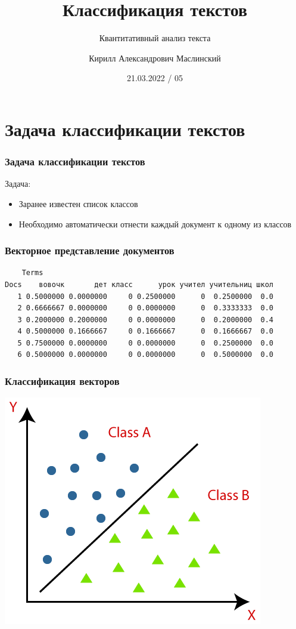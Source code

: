 \documentclass[svgnames]{beamer}
\title[CMTA 05] %
{Классификация текстов}
\subtitle
{Квантитативный анализ текста} %
\author%
{Кирилл Александрович Маслинский}
\institute%
{НИУ ВШЭ Санкт-Петербург}
\date%
{21.03.2022 / 05}
\begin{document}
\begin{frame}
  \titlepage
\end{frame}

\section{Задача классификации текстов}

\begin{frame}
  \frametitle{Задача классификации текстов}
  Задача:
  \begin{itemize}
  \item Заранее известен список \alert{классов}
  \item Необходимо автоматически отнести каждый документ к одному из классов
  \end{itemize}
\end{frame}

\begin{frame}[fragile]
  \frametitle{Векторное представление документов}
  \begin{verbatim}
    Terms
Docs    вовочк       дет класс      урок учител учительниц школ
   1 0.5000000 0.0000000     0 0.2500000      0  0.2500000  0.0
   2 0.6666667 0.0000000     0 0.0000000      0  0.3333333  0.0
   3 0.2000000 0.2000000     0 0.0000000      0  0.2000000  0.4
   4 0.5000000 0.1666667     0 0.1666667      0  0.1666667  0.0
   5 0.7500000 0.0000000     0 0.0000000      0  0.2500000  0.0
   6 0.5000000 0.0000000     0 0.0000000      0  0.5000000  0.0
\end{verbatim}
\end{frame}

\begin{frame}
  \frametitle{Классификация векторов}
  \centering
  \includegraphics[height=.8\textheight]{classification-algorithm-in-machine-learning}
\end{frame}
\end{document}
